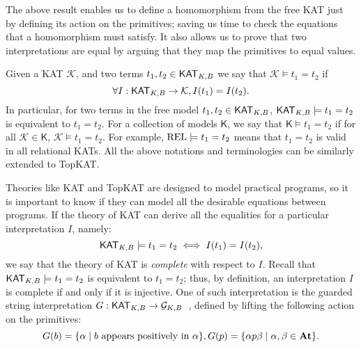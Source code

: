 The above result enables us to define a homomorphism from the free KAT just by
defining its action on the primitives; saving us time to check the equations
that a homomorphism must satisfy.  It also allows us to prove that two
interpretations are equal by arguing that they map the primitives to
equal values.

Given a KAT \(\mathcal{K}\), and two terms \(t_{1}, t_{2}  \in  \mathsf{KAT}_{K, B}\) we say that \(\mathcal{K}  \models  t_{1} = t_{2}\) if
\[ \forall  I : \mathsf{KAT}_{K, B}  \to  \mathcal{K}, I(t_{1}) = I(t_{2}).\] In particular, 
for two terms in the free model \(t_{1}, t_{2}  \in  \mathsf{KAT}_{K, B}\),
\(\mathsf{KAT}_{K, B}  \models  t_{1} = t_{2}\) is equivalent to \(t_{1} = t_{2}\).  
For a collection of models \(\mathsf{K}\), 
we say that \(\mathsf{K}  \models  t_{1} = t_{2}\) if for all \(\mathcal{K}  \in  \mathsf{K}\),
\(\mathcal{K}  \models  t_{1} = t_{2}\).  For example, \(\mathbf{\mathrm{REL}}  \models  t_{1} = t_{2}\) means that \(t_{1} = t_{2}\) is
valid in all relational KATs.  All the above notations and terminologies can be
similarly extended to TopKAT.

Theories like KAT and TopKAT are designed to model practical
programs, so it is important to know if they can model all the desirable
equations between programs. If the theory of KAT can derive all the equalities
for a particular interpretation \(I\), namely:
\[\mathsf{KAT}_{K, B}  \models  t_{1} = t_{2}  \iff  I(t_{1}) = I(t_{2}),\]
we say that the theory of KAT is \emph{complete} with respect to \(I\).
Recall that \(\mathsf{KAT}_{K, B}  \models  t_{1} = t_{2}\) is equivalent to \(t_{1} = t_{2}\);  
thus, by definition, an interpretation \(I\) is complete if and only if it is injective.
One of such interpretation is the guarded string interpretation
\(G: \mathsf{KAT}_{K, B}  \to  \mathcal{G}_{K, B}\)~\cite{Kozen_Smith_1997},
defined by lifting the following action on the primitives:
\[
    G(b) = \{ \alpha   \mid  \text{\(b\) appears positively in \( \alpha \)}\}, \\
    G(p) = \{ \alpha  p  \beta   \mid   \alpha ,  \beta   \in  \mathbf{At}\}.
\]



